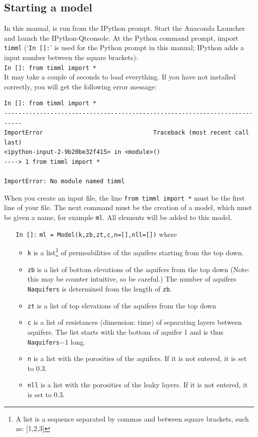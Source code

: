 \documentclass [10pt,letterpaper] {article}
\begin{document}
\subsection{Starting a model}
In this manual, \Timsp is run from the IPython prompt. Start the Anaconda Launcher and launch the IPython-Qtconsole. 
At the Python command prompt, import {\tt timml} (`{\tt In []:}' is used for the Python prompt in this manual; IPython adds a input number between the square brackets):
\\{\tt In []: from timml import *}
\\It may take a couple of seconds to load everything. If you
have not installed \Timsp correctly, you will get the following error message:
\begin{verbatim}
In []: from timml import *
---------------------------------------------------------------------------
ImportError                               Traceback (most recent call last)
<ipython-input-2-9b20be32f415> in <module>()
----> 1 from timml import *

ImportError: No module named timml
\end{verbatim}
When you create an input file, the line {\tt from timml import *} must be the
first line of your file. The next command must be the creation of a model,
which must be given a name, for example {\tt ml}. All elements will be added to this model.
\begin{itemize}
\item[{\tt In []:}] {\tt ml = Model(k,zb,zt,c,n=[],nll=[])} where
    \begin{itemize}
    \item {\tt k} is a list\footnote{A list is a sequence separated by commas and between square brackets,
    such as: [1,2,3]} of permeabilities of the aquifers starting
    from the top down.
    \item {\tt zb} is a list of bottom elevations of the aquifers
    from the top down (Note: this may be counter intuitive, so be
    careful.) The number of aquifers {\tt Naquifers} is determined from the length of {\tt zb}.
    \item {\tt zt} is a list of top elevations of the aquifers
    from the top down
    \item {\tt c} is a list of resistances (dimension: time) of separating layers
    between aquifers. The list starts with the bottom of aquifer 1 and is thus
    {\tt Naquifers}$-1$ long.
    \item {\tt n} is a list with the porosities of the aquifers. If it is not entered, it is set to 0.3.
    \item {\tt nll} is a list with the porosities of the leaky layers. If it is not entered, it is set to 0.3.
    \end{itemize}
\end{itemize}
\end{document}
